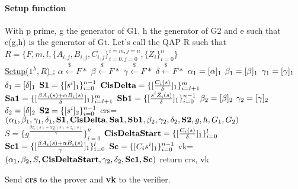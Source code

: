 \paragraph{Setup function}
With p prime, g the generator of G1, h the generator of G2 and e such that e(g,h) is the generator of Gt.
Let's call the QAP R such that  $R = \{F, m, l, \{A_{i,j}, B_{i,j}, C_{i,j}\}_{i=0,j=0}^{i=m,j=n}, \{Z_i\}_{i=0}^n\}$
\\\underline{Setup($1^\lambda, R$) :}
\tabNormal $\alpha \xleftarrow[]{\$}F*$
\tabNormal $\beta \xleftarrow[]{\$}F*$
\tabNormal $\gamma \xleftarrow[]{\$}F*$
\tabNormal $\delta \xleftarrow[]{\$}F*$
\tabNormal $\textbf{$\alpha_1$} = [\alpha]_1$
\tabNormal $\textbf{$\beta_1$} = [\beta]_1$
\tabNormal $\textbf{$\gamma_1$} = [\gamma]_1$
\tabNormal $\textbf{$\delta_1$} = [\delta]_1$
\tabNormal $\textbf{S1}=\{[s^i]_1\}_{i=0}^{n-1}$
\tabNormal $ \textbf{CisDelta} = \{[\frac{C_i (s)}{\delta}]_1\}_{i=l+1}^m$
\tabNormal $\textbf{Sa1} = \{[\frac{\beta A_i (s) + \alpha B_i (s)}{\delta}]_1\}_{i=l+1}^m$
\tabNormal $\textbf{Sb1} = \{[\frac{s^i Z_i(s)}{\delta}]_1\}_{i=0}^{n-1}$
\tabNormal $\textbf{$\beta_2$} = [\beta]_2$
\tabNormal $\textbf{$\gamma_2$} = [\gamma]_2$
\tabNormal $\textbf{$\delta_2$} = [\delta]_2$
\tabNormal $\textbf{S2} = \{[s^i]_2\}_{i=0}^{n-1}$
\tabNormal crs=$(\textbf{$\alpha_1$}, \textbf{$\beta_1$},\textbf{$\gamma_1$} ,\textbf{$\delta_1$}, \textbf{S1}, \textbf{CisDelta},\textbf{Sa1}, \textbf{Sb1}, \textbf{$\beta_2$},\textbf{$\gamma_2$} ,\textbf{$\delta_2$}, \textbf{S2}, g, h, G_1, G_2)$
\tabNormal $S=\{g^{\frac{\beta x_i(s) + \alpha y_i(s) + z_i(s)}{\gamma}}\}_{i=0}^{n}$
\tabNormal $\textbf{CisDeltaStart} = \{[\frac{C_i (s)}{\delta}]_1\}_{i=0}^l$
\tabNormal $\textbf{Sc1} = \{[\frac{\beta A_i (s) + \alpha B_i (s)}{\gamma}]_1\}_{i=0}^l$
\tabNormal $\textbf{Sc}=\{[C_i s^i]_1\}_{i=0}^{n-1}$
\tabNormal vk=$(\textbf{$\alpha_1$}, \textbf{$\beta_2$} , S, \textbf{CisDeltaStart}, \textbf{$\gamma_2$}, \textbf{$\delta_2$}, \textbf{Sc1}, \textbf{Sc})$
\tabNormal return crs, vk

Send \textbf{crs} to the prover and \textbf{vk} to the verifier.